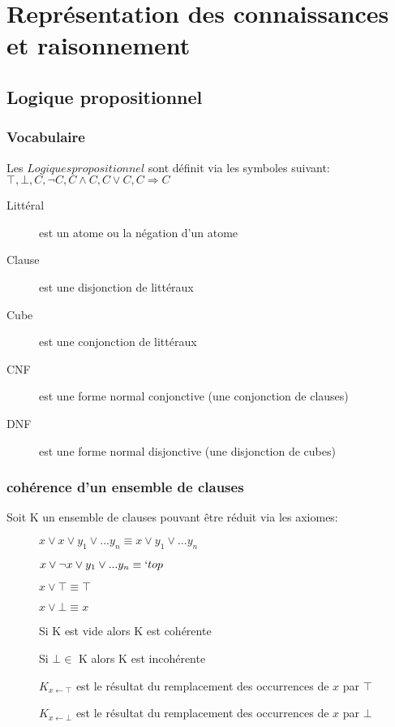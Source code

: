 \part{Représentation des connaissances et raisonnement}
\pagebreak

\chapter{Logique propositionnel}
\section{Vocabulaire}
Les $Logiques propositionnel$ sont définit via les symboles suivant:\\
$\top, \bot, C, \neg C, C \wedge C, C \vee C, C \Rightarrow C$ \\

\begin{description}
\item[Littéral] est un atome ou la négation d'un atome
\item[Clause] est une disjonction de littéraux
\item[Cube] est une conjonction de littéraux
\item[CNF] est une forme normal conjonctive (une conjonction de clauses)
\item[DNF] est une forme normal disjonctive (une disjonction de cubes)
\end{description}

\section{cohérence d'un ensemble de clauses}
Soit K un ensemble de clauses pouvant être réduit via les axiomes:
\begin{description}
\item[] $x \vee x \vee y_1 \vee ... y_n \equiv x \vee y_1 \vee ... y_n$
\item[] $x \vee \neg x \vee y_1 \vee ... y_n \equiv `top$
\item[] $x \vee \top \equiv \top$
\item[] $x \vee \bot \equiv x$
\item[] Si K est vide alors K est cohérente
\item[] Si $\bot \in $ K alors K est incohérente
\item[] $K_{x \leftarrow \top}$ est le résultat du remplacement des occurrences de $x$ par $\top$
\item[] $K_{x \leftarrow \bot}$ est le résultat du remplacement des occurrences de $x$ par $\bot$
\end{description}


